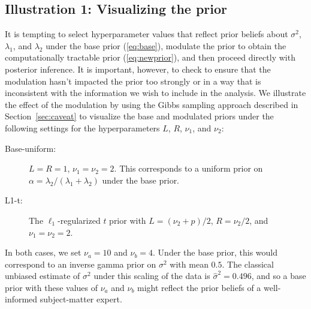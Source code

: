 \documentclass[12pt]{article}
\begin{document}
\subsection{Illustration 1: Visualizing the prior}\label{sec:visprior}
It is tempting to select hyperparameter values that reflect prior beliefs
about $\sigma^2$, $\lambda_1$, and $\lambda_2$ under the base prior (\ref{eq:base}),
modulate the prior to obtain the computationally tractable prior (\ref{eq:newprior}),
and then proceed directly with posterior inference. It is important, however, to 
check to ensure that the modulation hasn't impacted the prior too strongly or 
in a way that is inconsistent with the information we wish to include in the analysis.
We illustrate the effect of the modulation by using the Gibbs sampling approach described
in Section~\ref{sec:caveat} to visualize the base and modulated priors under the following
settings for the hyperparameters $L$, $R$, $\nu_1$, and $\nu_2$:
\begin{description}
\item[Base-uniform:] $L = R = 1$, $\nu_1 = \nu_2 = 2$. This corresponds to a uniform
prior on $\alpha = \lambda_2/(\lambda_1 + \lambda_2)$ under the base prior.
\item[L1-t:] The $\ell_1$-regularized $t$ prior with $L = (\nu_2 + p)/2$,
$R = \nu_2/2$, and $\nu_1 = \nu_2 = 2$.
\end{description}
In both cases, we set $\nu_a = 10$ and $\nu_b = 4$. Under the base prior, this would
correspond to an inverse gamma prior on $\sigma^2$ with mean $0.5$. The classical
unbiased estimate of $\sigma^2$ under this scaling of the data is 
$\hat{\sigma}^2 = 0.496$, and so a base prior with these values of $\nu_a$ and
$\nu_b$ might reflect the prior beliefs of a well-informed subject-matter 
expert.
\end{document}
